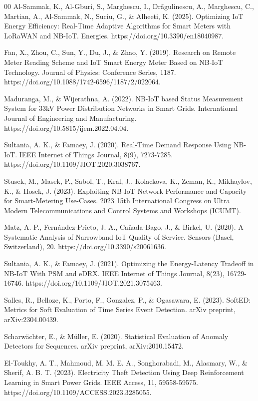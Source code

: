 \documentclass{ieeeaccess}
\begin{document}
\begin{thebibliography}{00}
 Al-Sammak, K., Al-Gburi, S., Marghescu, I., Drãgulinescu, A., Marghescu, C., Martian, A., Al-Sammak, N., Suciu, G., \& Alheeti, K. (2025). Optimizing IoT Energy Efficiency: Real-Time Adaptive Algorithms for Smart Meters with LoRaWAN and NB-IoT. Energies. https://doi.org/10.3390/en18040987.

 Fan, X., Zhou, C., Sun, Y., Du, J., \& Zhao, Y. (2019). Research on Remote Meter Reading Scheme and IoT Smart Energy Meter Based on NB-IoT Technology. Journal of Physics: Conference Series, 1187. https://doi.org/10.1088/1742-6596/1187/2/022064.

 Maduranga, M., \& Wijerathna, A. (2022). NB-IoT based Status Measurement System for 33kV Power Distribution Networks in Smart Grids. International Journal of Engineering and Manufacturing. https://doi.org/10.5815/ijem.2022.04.04.

 Sultania, A. K., \& Famaey, J. (2020). Real-Time Demand Response Using NB-IoT. IEEE Internet of Things Journal, 8(9), 7273-7285. https://doi.org/10.1109/JIOT.2020.3038767.

 Stusek, M., Masek, P., Sabol, T., Kral, J., Kolackova, K., Zeman, K., Mikhaylov, K., \& Hosek, J. (2023). Exploiting NB-IoT Network Performance and Capacity for Smart-Metering Use-Cases. 2023 15th International Congress on Ultra Modern Telecommunications and Control Systems and Workshops (ICUMT).

 Matz, A. P., Fernández-Prieto, J. A., Cañada-Bago, J., \& Birkel, U. (2020). A Systematic Analysis of Narrowband IoT Quality of Service. Sensors (Basel, Switzerland), 20. https://doi.org/10.3390/s20061636.

 Sultania, A. K., \& Famaey, J. (2021). Optimizing the Energy-Latency Tradeoff in NB-IoT With PSM and eDRX. IEEE Internet of Things Journal, 8(23), 16729-16746. https://doi.org/10.1109/JIOT.2021.3075463.

 Salles, R., Belloze, K., Porto, F., Gonzalez, P., \& Ogasawara, E. (2023). SoftED: Metrics for Soft Evaluation of Time Series Event Detection. arXiv preprint, arXiv:2304.00439.

 Scharwächter, E., \& Müller, E. (2020). Statistical Evaluation of Anomaly Detectors for Sequences. arXiv preprint, arXiv:2010.15472.

 El-Toukhy, A. T., Mahmoud, M. M. E. A., Songhorabadi, M., Alasmary, W., \& Sherif, A. B. T. (2023). Electricity Theft Detection Using Deep Reinforcement Learning in Smart Power Grids. IEEE Access, 11, 59558-59575. https://doi.org/10.1109/ACCESS.2023.3285055.

\end{thebibliography}

\EOD
\end{document}
